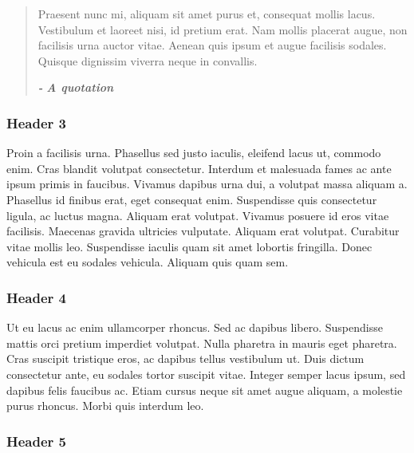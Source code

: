 \documentclass{article}
\begin{document}
\begin{quote}



Praesent nunc mi, aliquam sit amet purus et, consequat mollis lacus. Vestibulum et laoreet nisi, id pretium erat. Nam mollis placerat augue, non facilisis urna auctor vitae. Aenean quis ipsum et augue facilisis sodales. Quisque dignissim viverra neque in convallis. 

\emph{\textbf{-}} \emph{\textbf{A quotation}}


\end{quote}


\subsubsection{Header 3}\label{H940055}



Proin a facilisis urna. Phasellus sed justo iaculis, eleifend lacus ut, commodo enim. Cras blandit volutpat consectetur. Interdum et malesuada fames ac ante ipsum primis in faucibus. Vivamus dapibus urna dui, a volutpat massa aliquam a. Phasellus id finibus erat, eget consequat enim. Suspendisse quis consectetur ligula, ac luctus magna. Aliquam erat volutpat. Vivamus posuere id eros vitae facilisis. Maecenas gravida ultricies vulputate. Aliquam erat volutpat. Curabitur vitae mollis leo. Suspendisse iaculis quam sit amet lobortis fringilla. Donec vehicula est eu sodales vehicula. Aliquam quis quam sem.


\subsubsection{Header 4}\label{H1559559}



Ut eu lacus ac enim ullamcorper rhoncus. Sed ac dapibus libero. Suspendisse mattis orci pretium imperdiet volutpat. Nulla pharetra in mauris eget pharetra. Cras suscipit tristique eros, ac dapibus tellus vestibulum ut. Duis dictum consectetur ante, eu sodales tortor suscipit vitae. Integer semper lacus ipsum, sed dapibus felis faucibus ac. Etiam cursus neque sit amet augue aliquam, a molestie purus rhoncus. Morbi quis interdum leo.


\subsubsection{Header 5}\label{H7046962}
\end{document}
